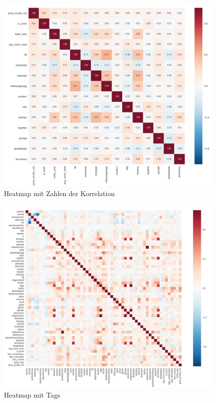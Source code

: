 \begin{figure}[h]
  \centering
  \includegraphics[width=\linewidth]{images/anhang/analysis/HeatMap_Importance.png}
  \caption{Heatmap mit Zahlen der Korrelation}
  \end{figure}
  
\begin{figure}[h]
  \centering
  \includegraphics[width=\linewidth]{images/anhang/analysis/HeatMap_all.png}
  \caption{Heatmap mit Tags} 
\end{figure}

